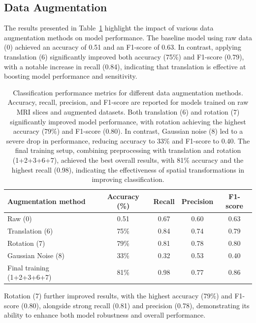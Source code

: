 \subsection{Data Augmentation}

The results presented in Table~\ref{tab:model_meetrics_augmentation} highlight the impact of various data augmentation methods on model performance. The baseline model using raw data (0) achieved an accuracy of 0.51 and an F1-score of 0.63. In contrast, applying translation (6) significantly improved both accuracy (75\%) and F1-score (0.79), with a notable increase in recall (0.84), indicating that translation is effective at boosting model performance and sensitivity.
\begin{center}
	\begin{table}[t]
		\centering
		\caption{\label{tab:model_meetrics_augmentation}Classification performance metrics for different data augmentation methods. Accuracy, recall, precision, and F1-score are reported for models trained on raw MRI slices and augmented datasets. Both translation (6) and rotation (7) significantly improved model performance, with rotation achieving the highest accuracy (79\%) and F1-score (0.80). In contrast, Gaussian noise (8) led to a severe drop in performance, reducing accuracy to 33\% and F1-score to 0.40. The final training setup, combining preprocessing with translation and rotation (1+2+3+6+7), achieved the best overall results, with 81\% accuracy and the highest recall (0.98), indicating the effectiveness of spatial transformations in improving classification.}
		\begin{tabular*}{500pt}{@{\extracolsep\fill}lcccc@{\extracolsep\fill}}
			\toprule
			\textbf{Augmentation method} &\textbf{Accuracy (\%)} &  \textbf{Recall} &\textbf{Precision} &\textbf{F1-score}\\
			\midrule
			Raw (0) & 0.51 & 0.67 & 0.60 & 0.63 \\
			Translation (6) & 75\% & 0.84 & 0.74 & 0.79 \\
			Rotation (7) & 79\% & 0.81 & 0.78 & 0.80 \\
			Gaussian Noise (8) & 33\% & 0.32 & 0.53 & 0.40 \\
            Final training (1+2+3+6+7) & 81\% & 0.98 & 0.77 & 0.86 \\
			\bottomrule
		\end{tabular*}
	\end{table}
\end{center}
Rotation (7) further improved results, with the highest accuracy (79\%) and F1-score (0.80), alongside strong recall (0.81) and precision (0.78), demonstrating its ability to enhance both model robustness and overall performance.

